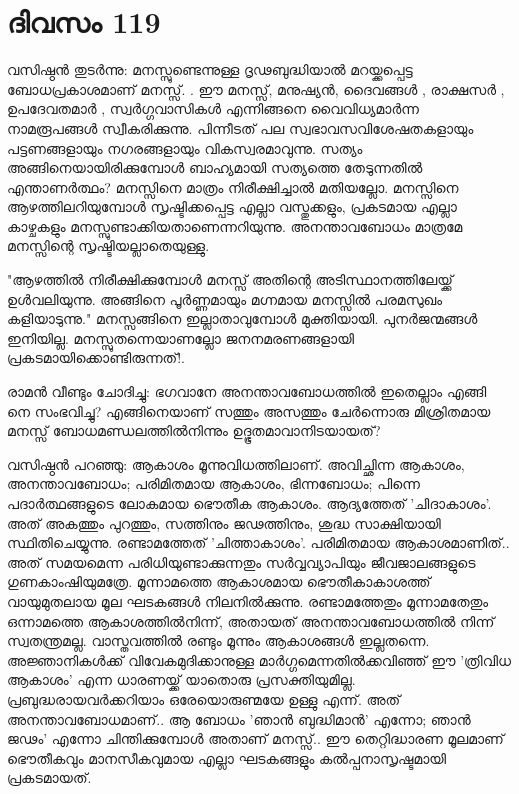 \newpage
\section{ദിവസം 119}


വസിഷ്ഠന്‍ തുടര്‍ന്നു: മനസ്സുണ്ടെന്നുള്ള ദൃഢബുദ്ധിയാല്‍ മറയ്ക്കപ്പെട്ട ബോധപ്രകാശമാണ്‌ മനസ്സ്‌. . ഈ മനസ്സ്‌, മനുഷ്യന്‍, ദൈവങ്ങള്‍ , രാക്ഷസര്‍ , ഉപദേവതമാര്‍ , സ്വര്‍ഗ്ഗവാസികള്‍ എന്നിങ്ങനെ വൈവിധ്യമാര്‍ന്ന നാമരൂപങ്ങള്‍ സ്വീകരിക്കുന്നു. പിന്നീടത്‌ പല സ്വഭാവസവിശേഷതകളായും പട്ടണങ്ങളായും നഗരങ്ങളായും വികസ്വരമാവുന്നു. സത്യം അങ്ങിനെയായിരിക്കുമ്പോള്‍ ബാഹ്യമായി സത്യത്തെ തേടുന്നതില്‍ എന്താണര്‍ത്ഥം? മനസ്സിനെ മാത്രം നിരീക്ഷിച്ചാല്‍ മതിയല്ലോ. മനസ്സിനെ ആഴത്തിലറിയുമ്പോള്‍ സൃഷ്ടിക്കപ്പെട്ട എല്ലാ വസ്തുക്കളും, പ്രകടമായ എല്ലാ കാഴ്ചകളും മനസ്സുണ്ടാക്കിയതാണെന്നറിയുന്നു. അനന്താവബോധം മാത്രമേ മനസ്സിന്റെ സൃഷ്ടിയല്ലാതെയുള്ളു.

"ആഴത്തില്‍ നിരീക്ഷിക്കുമ്പോള്‍ മനസ്സ്‌ അതിന്റെ അടിസ്ഥാനത്തിലേയ്ക്ക്‌ ഉള്‍വലിയുന്നു. അങ്ങിനെ പൂര്‍ണ്ണമായും മഗ്നമായ മനസ്സില്‍ പരമസുഖം കളിയാടുന്നു." മനസ്സങ്ങിനെ ഇല്ലാതാവുമ്പോള്‍ മുക്തിയായി. പുനര്‍ജന്മങ്ങള്‍ ഇനിയില്ല. മനസ്സുതന്നെയാണല്ലോ ജനനമരണങ്ങളായി പ്രകടമായിക്കൊണ്ടിരുന്നത്‌!.

രാമന്‍ വീണ്ടും ചോദിച്ചു: ഭഗവാനേ അനന്താവബോധത്തില്‍ ഇതെല്ലാം എങ്ങി നെ സംഭവിച്ചു? എങ്ങിനെയാണ്‌ സത്തും അസത്തും ചേര്‍ന്നൊരു മിശ്രിതമായ മനസ്സ്‌ ബോധമണ്ഡലത്തില്‍നിന്നും ഉദ്ഭൂതമാവാനിടയായത്‌?

വസിഷ്ഠന്‍ പറഞ്ഞു: ആകാശം മൂന്നുവിധത്തിലാണ്‌. അവിച്ഛിന്ന ആകാശം, അനന്താവബോധം; പരിമിതമായ ആകാശം, ഭിന്നബോധം; പിന്നെ പദാര്‍ത്ഥങ്ങളുടെ ലോകമായ ഭൌതീക ആകാശം. ആദ്യത്തേത്‌ 'ചിദാകാശം'. അത്‌ അകത്തും പുറത്തും, സത്തിനും ജഢത്തിനും, ശുദ്ധ സാക്ഷിയായി സ്ഥിതിചെയ്യുന്നു. രണ്ടാമത്തേത്‌ 'ചിത്താകാശം'. പരിമിതമായ ആകാശമാണിത്‌.. അത്‌ സമയമെന്ന പരിധിയുണ്ടാക്കുന്നതും സര്‍വ്വവ്യാപിയും ജീവജാലങ്ങളുടെ ഗുണകാംഷിയുമത്രേ. മൂന്നാമത്തെ ആകാശമായ ഭൌതീകാകാശത്ത്‌ വായുമുതലായ മൂല ഘടകങ്ങള്‍ നിലനില്‍ക്കുന്നു. രണ്ടാമത്തേതും മൂന്നാമതേതും ഒന്നാമത്തെ ആകാശത്തില്‍നിന്ന്, അതായത് അനന്താവബോധത്തില്‍ നിന്ന് സ്വതന്ത്രമല്ല. വാസ്തവത്തില്‍ രണ്ടും മൂന്നും ആകാശങ്ങള്‍ ഇല്ലതന്നെ. അജ്ഞാനികള്‍ക്ക്‌ വിവേകമുദിക്കാനുള്ള മാര്‍ഗ്ഗമെന്നതില്‍ക്കവിഞ്ഞ്‌ ഈ 'ത്രിവിധ ആകാശം' എന്ന ധാരണയ്ക്ക്‌ യാതൊരു പ്രസക്തിയുമില്ല. പ്രബുദ്ധരായവര്‍ക്കറിയാം ഒരേയൊരുണ്മയേ ഉള്ളു എന്ന്. അത്‌ അനന്താവബോധമാണ്‌.. ആ ബോധം 'ഞാന്‍ ബുദ്ധിമാന്‍' എന്നോ; ഞാന്‍ ജഢം' എന്നോ ചിന്തിക്കുമ്പോള്‍ അതാണ്‌ മനസ്സ്‌.. ഈ തെറ്റിദ്ധാരണ മൂലമാണ് ഭൌതീകവും മാനസീകവുമായ എല്ലാ ഘടകങ്ങളും കല്‍പ്പനാസൃഷ്ടമായി പ്രകടമായത്‌.

